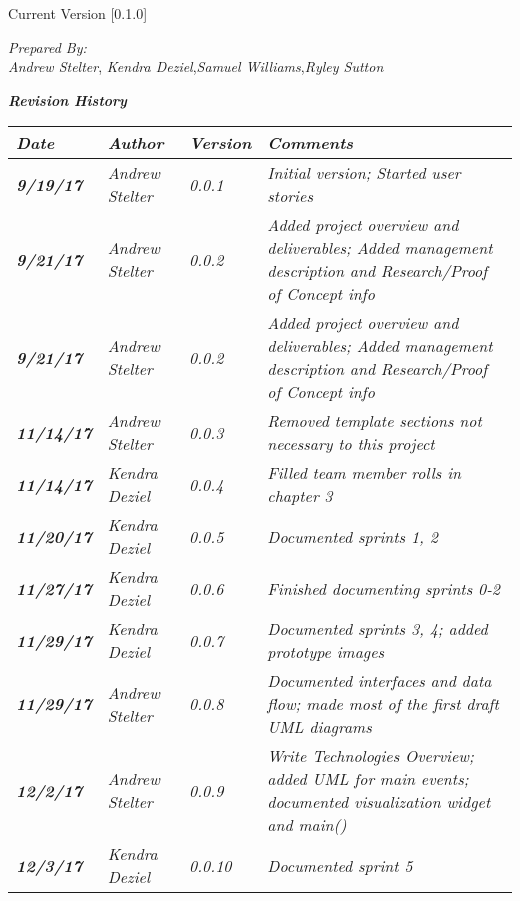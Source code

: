 


Current Version [0.1.0]
\vspace*{5mm}

{\color{SDColor5}
\noindent
\textit{Prepared By:}\\
\textit{Andrew Stelter}, \textit{Kendra Deziel},\textit{Samuel Williams},\textit{Ryley Sutton}
}

\vfill
\noindent
{\color{SDColor3} \textit{\textbf{Revision History}}}\\
\begin{tabular}{|>{\raggedright}p{1.5cm}|>{\raggedright}p{3cm}|>{\raggedright}p{1.5cm}|>{\raggedright}p{9cm}|}
\hline
\textit{\textbf{Date}} &  \textit{\textbf{Author}} & \textit{\textbf{Version}} & \textit{\textbf{Comments}}\tabularnewline
\hline
 \textit{\textbf{9/19/17}} & \textit{Andrew Stelter} & \textit{0.0.1} & \textit{Initial version; Started user stories}\tabularnewline
\hline
\textit{\textbf{9/21/17}} & \textit{Andrew Stelter} & \textit{0.0.2} & \textit{Added project overview and deliverables; Added management description and Research/Proof of Concept info }\tabularnewline
\hline
\textit{\textbf{9/21/17}} & \textit{Andrew Stelter} & \textit{0.0.2} & \textit{Added project overview and deliverables; Added management description and Research/Proof of Concept info }\tabularnewline
\hline
\textit{\textbf{11/14/17}} & \textit{Andrew Stelter} & \textit{0.0.3} & \textit{Removed template sections not necessary to this project}\tabularnewline
\hline
\textit{\textbf{11/14/17}} & \textit{Kendra Deziel} & \textit{0.0.4} & \textit{Filled team member rolls in chapter 3}\tabularnewline
\hline
\textit{\textbf{11/20/17}} & \textit{Kendra Deziel} & \textit{0.0.5} & \textit{Documented sprints 1, 2}\tabularnewline
\hline
\textit{\textbf{11/27/17}} & \textit{Kendra Deziel} & \textit{0.0.6} & \textit{Finished documenting sprints 0-2}\tabularnewline
\hline
\textit{\textbf{11/29/17}} & \textit{Kendra Deziel} & \textit{0.0.7} & \textit{Documented sprints 3, 4; added prototype images}\tabularnewline
\hline
\textit{\textbf{11/29/17}} & \textit{Andrew Stelter} & \textit{0.0.8} & \textit{Documented interfaces and data flow; made most of the first draft UML diagrams}\tabularnewline
\hline
\textit{\textbf{12/2/17}} & \textit{Andrew Stelter} & \textit{0.0.9} & \textit{Write Technologies Overview; added UML for main events; documented visualization widget and main()}\tabularnewline
\hline
\textit{\textbf{12/3/17}} & \textit{Kendra Deziel} & \textit{0.0.10} & \textit{Documented sprint 5}\tabularnewline

\end{tabular}
